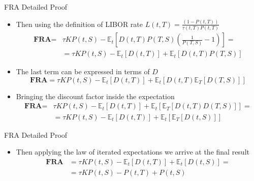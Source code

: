 \documentclass{beamer}
\begin{document}
\begin{frame}{FRA Detailed Proof}
	\begin{itemize}
		\item<1-> Then using the definition of LIBOR rate $L(t,T)=\frac{(1-P(t,T))}{\tau(t,T)P(t,T)}$
		\begin{equation*}
			\begin{aligned}
			\textbf{FRA} = &\tau KP(t,S)-\mathbb{E}_t\left[D(t,T)P(T,S)\left(\frac{1}{P(T,S)}-1\right)\right]= \\
			&=\tau KP(t,S)-\mathbb{E}_t[D(t,T)] + \mathbb{E}_t[D(t,T)P(T,S)]
			\end{aligned}
		\end{equation*}
		\item<2-> The last term can be expressed in terms of $D$
		\begin{equation*}
			\textbf{FRA} = \tau KP(t,S)-\mathbb{E}_t[D(t,T)] + \mathbb{E}_t\left[D(t,T)\mathbb{E}_T[D(T,S)]\right]
		\end{equation*}		
		\item<2-> Bringing the discount factor inside the expectation
		\begin{equation*}
			\begin{aligned}
			\textbf{FRA} = &\tau KP(t,S)-\mathbb{E}_t[D(t,T)] + 				\mathbb{E}_t\left[\mathbb{E}_T[D(t,T)D(T,S)]\right]=\\
			&=\tau KP(t,S)-\mathbb{E}_t[D(t,T)] + 				\mathbb{E}_t\left[\mathbb{E}_T[D(t,S)]\right]
			\end{aligned}
		\end{equation*}		
	\end{itemize}
\end{frame}

\begin{frame}{FRA Detailed Proof}
	\begin{itemize}
		\item<1-> Then applying the law of iterated expectations we arrive at the final result
		\begin{equation*}
			\begin{aligned}
			\textbf{FRA} &= \tau KP(t,S)-\mathbb{E}_t[D(t,T)] + 			\mathbb{E}_t[D(t,S)] = \\
				&= \boxed{\tau KP(t,S) - P(t,T) + P(t,S)}
			\end{aligned}
		\end{equation*}
		\myendproof
	\end{itemize}
\end{frame}
\end{document}
